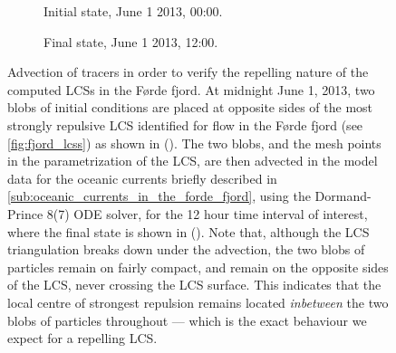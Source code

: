 \begin{figure}[htpb]
    \centering
    \hspace*{\fill}
    \begin{subfigure}[b]{0.425\textwidth}
        \centering
        \caption[]{{\small Initial state, June 1 2013, 00:00.}}
        \label{fig:blobtest-fjord-pre}
    \end{subfigure}\hfill%
    \begin{subfigure}[b]{0.425\textwidth}
        \centering
        \caption[]{{\small Final state, June 1 2013, 12:00.}}
        \label{fig:blobtest-fjord-post}
    \end{subfigure}
    \hspace*{\fill}
    \caption[Advection of tracers in order to verify the repelling nature of
    the computed LCSs in the Førde fjord]
    {%
        Advection of tracers in order to verify the repelling nature of the
        computed LCSs in the Førde fjord. At midnight June 1, 2013, two blobs
        of initial conditions are placed at opposite sides of the most strongly
        repulsive LCS identified for flow in the Førde fjord (see
        \cref{fig:fjord_lcss}) as shown in (). The
        two blobs, and the mesh points in the parametrization of the LCS, are
        then advected in the model data for the oceanic currents briefly
        described in \cref{sub:oceanic_currents_in_the_forde_fjord}, using the
        Dormand-Prince 8(7) ODE solver, for the 12 hour time interval of
        interest, where the final state is shown in
        (). Note that, although the LCS
        triangulation breaks down under the advection, the two blobs of
        particles remain on fairly compact, and remain on the opposite sides of
        the LCS, never crossing the LCS surface. This indicates that the local
        centre of strongest repulsion remains located \emph{inbetween} the
        two blobs of particles throughout --- which
        is the exact behaviour we expect for a repelling LCS.
    }
    \label{fig:blobtest-fjord}
\end{figure}

